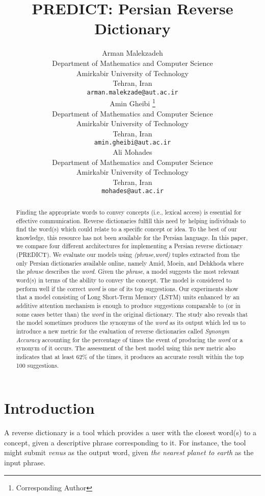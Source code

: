 \documentclass{article}
\title{PREDICT: Persian Reverse Dictionary}
\author{
  Arman Malekzadeh \\
  Department of Mathematics and Computer Science\\
  Amirkabir University of Technology\\
  Tehran, Iran \\
  \texttt{arman.malekzade@aut.ac.ir} \\
   \And
 Amin Gheibi
 \thanks{Corresponding Author} \\
  Department of Mathematics and Computer Science\\
  Amirkabir University of Technology\\
  Tehran, Iran \\
  \texttt{amin.gheibi@aut.ac.ir} \\
   \And
 Ali Mohades \\
  Department of Mathematics and Computer Science\\
  Amirkabir University of Technology\\
  Tehran, Iran \\
  \texttt{mohades@aut.ac.ir} \\
}
\begin{document}
\maketitle

\begin{abstract}
Finding the appropriate words to convey concepts (i.e., lexical access) is essential for effective communication. Reverse dictionaries fulfill this need by helping individuals to find the word(s) which could relate to a specific concept or idea. To the best of our knowledge, this resource has not been available for the Persian language. In this paper, we compare four different architectures for implementing a Persian reverse dictionary (PREDICT). 
 We evaluate our models using \textit{(phrase,word)} tuples extracted from the only Persian dictionaries available online, namely Amid, Moein, and Dehkhoda where the \textit{phrase} describes the \textit{word}. Given the \textit{phrase}, a model suggests the most relevant word(s) in terms of the ability to convey the concept.
The model is considered to perform well if the correct \textit{word} is one of its top suggestions.
  Our experiments show that a model consisting of Long Short-Term Memory (LSTM) units enhanced by an additive attention mechanism is enough to produce suggestions comparable to (or in some cases better than) the \textit{word} in the original dictionary. The study also reveals that the model sometimes produces the synonyms of the \textit{word} as its output which led us to introduce a new metric for the evaluation of reverse dictionaries called \textit{Synonym Accuracy} accounting for the percentage of times the event of producing the \textit{word} or a synonym of it occurs. The assessment of the best model using this new metric also indicates that at least 62\% of the times, it produces an accurate result within the top 100 suggestions.
\end{abstract}




\section{Introduction}
A reverse dictionary is a tool which provides a user with the closest word(s) to a concept, given a descriptive phrase corresponding to it. For instance, the tool might submit \textit{venus} as the output word, given \textit{the nearest planet to earth} as the input phrase.
\end{document}
